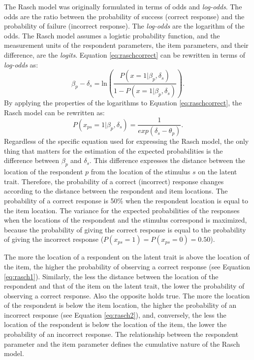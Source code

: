 \documentclass[12pt]{book}
\begin{document}
The Rasch model was originally formulated in terms of odds and \emph{log-odds}. The odds are the ratio between the probability of success (correct response) and the probability of failure (incorrect response). The \emph{log-odds} are the logarithm of the odds. 
The Rasch model assumes a logistic probability function, and the measurement units of the respondent parameters, the item parameters, and their difference, are the \emph{logits}.
Equation \ref{eq:raschcorrect} can be rewritten in terms of \emph{log-odds} as:
\begin{equation}\label{eq:raschcorrectlog}
	\beta_p - \delta_s = \text{ln}\left(\frac{P(x =1|\beta_p, \delta_s)}{1 - P(x =1|\beta_p, \delta_s)}\right).
\end{equation} 
By applying the properties of the logarithms to Equation \ref{eq:raschcorrect}, the Rasch model can be rewritten as: 
\begin{equation}\label{eq:inverseraschInverse}
	P(x_{ps} = 1 |\beta_p, \delta_s) = \frac{1}{exp(\delta_s - \theta_p)}.
\end{equation}
Regardless of the specific equation used for expressing the Rasch model, the only thing that matters for the estimation of the expected probabilities is the difference between $\beta_p$ and $\delta_s$. 
This difference expresses the distance between the location of the respondent $p$ from the location of the stimulus $s$ on the latent trait. 
Therefore, the   probability  of a correct (incorrect) response changes according to the distance between the respondent and item locations. The probability of a correct response is 50\% when the respondent location is equal to the item location. 
The variance for the expected probabilities of the responses when the locations of the respondent and the stimulus correspond is maximized, because the probability of giving the correct response is equal to the probability of giving the incorrect response ($P(x_{ps}=1) = P(x_{ps}=0)= 0.50$).

The more the location of a respondent on the latent trait is above the location of the item, the higher the probability of observing a correct response (see Equation \ref{eq:rasch1}). 
Similarly, the less the distance between the location of the respondent and that of the item on the latent trait, the lower the probability of observing a correct response.
Also the opposite holds true. 
The more the location of the respondent is below the item location, the higher  the probability of an incorrect response (see Equation \ref{eq:rasch2}), and, conversely, the less the location of the respondent is below the location of the item, the lower the probability of an incorrect response.
The relationship between the respondent parameter and the item parameter defines the cumulative nature of the Rasch model. 
\end{document}
